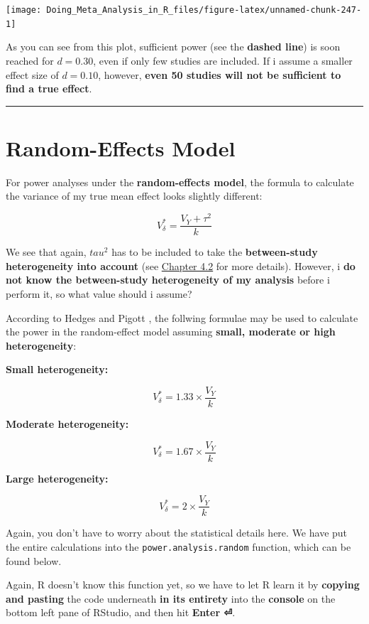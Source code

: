 \documentclass[]{book}
\begin{document}
\begin{center}\texttt{[image: Doing\_Meta\_Analysis\_in\_R\_files/figure-latex/unnamed-chunk-247-1]} \end{center}

As you can see from this plot, sufficient power (see the \textbf{dashed line}) is soon reached for \(d=0.30\), even if only few studies are included. If i assume a smaller effect size of \(d=0.10\), however, \textbf{even 50 studies will not be sufficient to find a true effect}.

\begin{center}\rule{0.5\linewidth}{\linethickness}\end{center}

\hypertarget{random-effects-model}{%
\section{Random-Effects Model}\label{random-effects-model}}

For power analyses under the \textbf{random-effects model}, the formula to calculate the variance of my true mean effect looks slightly different:

\[V_{\delta}^*=\frac{V_Y+\tau^2}{k}\]

We see that again, \(tau^2\) has to be included to take the \textbf{between-study heterogeneity into account} (see \protect\hyperlink{random}{Chapter 4.2} for more details). However, i \textbf{do not know the between-study heterogeneity of my analysis} before i perform it, so what value should i assume?

According to Hedges and Pigott \citep{hedges2004power}, the follwing formulae may be used to calculate the power in the random-effect model assuming \textbf{small, moderate or high heterogeneity}:

\textbf{Small heterogeneity:}

\[V_{\delta}^*=1.33\times\frac{V_Y}{k}\]

\textbf{Moderate heterogeneity:}

\[V_{\delta}^*=1.67\times\frac{V_Y}{k}\]

\textbf{Large heterogeneity:}

\[V_{\delta}^*=2\times\frac{V_Y}{k}\]

Again, you don't have to worry about the statistical details here. We have put the entire calculations into the \texttt{power.analysis.random} function, which can be found below.

Again, R doesn't know this function yet, so we have to let R learn it by \textbf{copying and pasting} the code underneath \textbf{in its entirety} into the \textbf{console} on the bottom left pane of RStudio, and then hit \textbf{Enter ⏎}.
\end{document}
